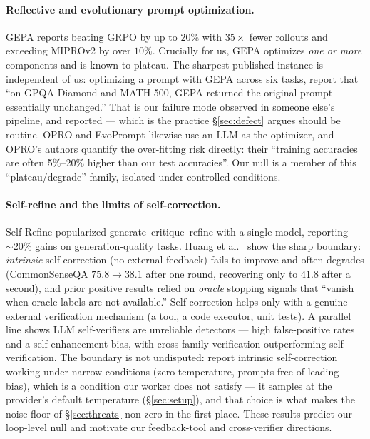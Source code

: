 \documentclass[11pt]{article}
\begin{document}
\paragraph{Reflective and evolutionary prompt optimization.}
GEPA \citep{agrawal2025gepa} reports beating GRPO by up to $20\%$ with $35\times$
fewer rollouts and exceeding MIPROv2 by over $10\%$. Crucially for us, GEPA
optimizes \emph{one or more} components and is known to plateau. The sharpest published
instance is independent of us: optimizing a prompt with GEPA across six tasks,
\citet{pappu2026multiagent} report that ``on GPQA Diamond and MATH-500, GEPA returned the
original prompt essentially unchanged.'' That is our failure mode observed in someone
else's pipeline, and reported --- which is the practice \S\ref{sec:defect} argues should be
routine. OPRO \citep{yang2023opro} and EvoPrompt \citep{guo2024evoprompt} likewise use an
LLM as the optimizer, and OPRO's authors quantify the over-fitting risk directly: their
``training accuracies are often 5\%--20\% higher than our test accuracies''. Our null is a
member of this ``plateau/degrade'' family, isolated under controlled conditions.

\paragraph{Self-refine and the limits of self-correction.}
Self-Refine \citep{madaan2023selfrefine} popularized generate--critique--refine
with a single model, reporting $\sim\!20\%$ gains on generation-quality tasks.
Huang et al.\ \citep{huang2023cannot} show the sharp boundary: \emph{intrinsic}
self-correction (no external feedback) fails to improve and often degrades
(CommonSenseQA $75.8 \!\to\! 38.1$ after one round, recovering only to $41.8$ after a
second), and prior positive results
relied on \emph{oracle} stopping signals that ``vanish when oracle labels are
not available.'' Self-correction helps only with a genuine external verification
mechanism (a tool, a code executor, unit tests). A parallel line shows LLM
self-verifiers are unreliable detectors --- high false-positive rates
\citep{valmeekam2023selfcritique} and a self-enhancement bias, with cross-family
verification outperforming self-verification. The boundary is not undisputed:
\citet{liu2024intrinsic} report intrinsic self-correction working under narrow conditions
(zero temperature, prompts free of leading bias), which is a condition our worker does not
satisfy --- it samples at the provider's default temperature (\S\ref{sec:setup}), and that
choice is what makes the noise floor of \S\ref{sec:threats} non-zero in the first place.
These results predict our loop-level
null and motivate our feedback-tool and cross-verifier directions.
\end{document}
